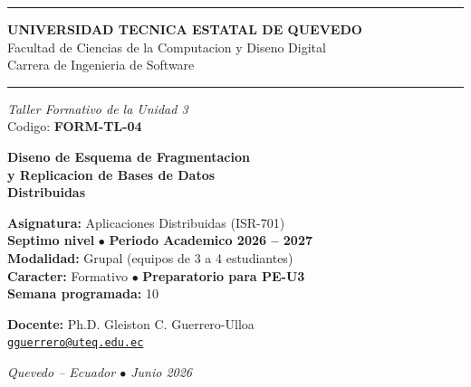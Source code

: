 \documentclass[11pt,a4paper]{article}
\begin{document}
\begin{titlepage}
\centering
\vspace*{0.5cm}

{\color{uteqBlue}\rule{\linewidth}{1.5pt}}\par
\vspace{0.4cm}

{\large\bfseries\color{uteqBlue} UNIVERSIDAD TECNICA ESTATAL DE QUEVEDO}\\[0.15cm]
{\normalsize\color{uteqGray} Facultad de Ciencias de la Computacion y Diseno Digital}\\[0.05cm]
{\normalsize\color{uteqGray} Carrera de Ingenieria de Software}\par
\vspace{0.3cm}
{\color{uteqBlue}\rule{\linewidth}{1.5pt}}\par

\vspace{2.5cm}

{\fontsize{14}{17}\selectfont\color{uteqTeal}\itshape Taller Formativo de la Unidad 3}\\[0.3cm]
{\fontsize{14}{17}\selectfont\color{uteqGray} Codigo: \textbf{FORM-TL-04}}\par
\vspace{1.2cm}

{\fontsize{26}{30}\selectfont\bfseries\color{uteqBlue}
Diseno de Esquema de Fragmentacion\\[0.2cm]
y Replicacion de Bases de Datos\\[0.2cm]
Distribuidas
\par}

\vspace{1.0cm}

\begin{tcolorbox}[enhanced, colback=uteqLight, colframe=uteqBlue, boxrule=0.8pt, arc=3mm, width=0.85\textwidth, center]
\centering\large
\textbf{Asignatura:} Aplicaciones Distribuidas (ISR-701)\\[0.15cm]
\textbf{Septimo nivel} \quad $\bullet$ \quad \textbf{Periodo Academico 2026 -- 2027}\\[0.15cm]
\textbf{Modalidad:} Grupal (equipos de 3 a 4 estudiantes)\\[0.15cm]
\textbf{Caracter:} Formativo \quad $\bullet$ \quad \textbf{Preparatorio para PE-U3}\\[0.15cm]
\textbf{Semana programada:} 10
\end{tcolorbox}

\vfill

{\large\bfseries\color{uteqGray} Docente:} {\large Ph.D. Gleiston C. Guerrero-Ulloa}\\[0.1cm]
\href{mailto:gguerrero@uteq.edu.ec}{\color{uteqMid}\texttt{gguerrero@uteq.edu.ec}}\par

\vspace{0.6cm}
{\small\itshape\color{uteqGray} Quevedo -- Ecuador \quad $\bullet$ \quad Junio 2026}
\end{titlepage}
\end{document}
